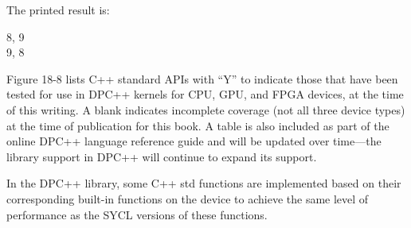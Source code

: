The printed result is:\par

\begin{tcolorbox}[colback=white,colframe=black]
8, 9\\
9, 8
\end{tcolorbox}

Figure 18-8 lists C++ standard APIs with “Y” to indicate those that have been tested for use in DPC++ kernels for CPU, GPU, and FPGA devices, at the time of this writing. A blank indicates incomplete coverage (not all three device types) at the time of publication for this book. A table is also included as part of the online DPC++ language reference guide and will be updated over time—the library support in DPC++ will continue to expand its support.\par

In the DPC++ library, some C++ std functions are implemented based on their corresponding built-in functions on the device to achieve the same level of performance as the SYCL versions of these functions.\par

